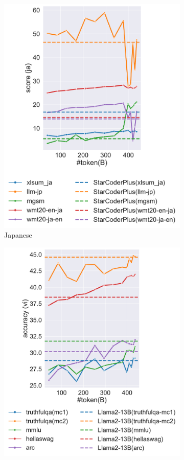 \begin{figure}[t]
\begin{subfigure}{0.24\textwidth}
        \includegraphics[width=\textwidth]{fig/aurora-m-ja.pdf}
        \caption{Japanese}
         \label{fig:trend-ja}
    \end{subfigure}
        \hfill
    \begin{subfigure}{0.24\textwidth}
        \centering
        \includegraphics[width=\textwidth]{fig/aurora-m-vi.pdf}

\end{subfigure}
\end{figure}
